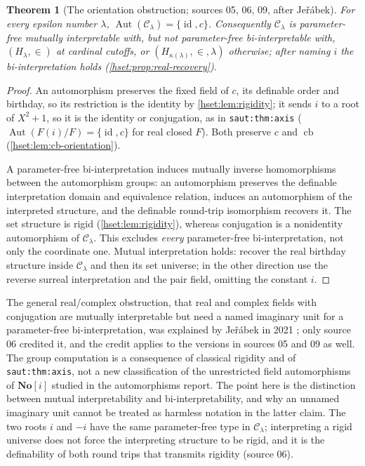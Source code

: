 \documentclass[11pt,letterpaper]{article}
\newtheorem{theorem}{Theorem}[section]
\theoremstyle{definition}
\theoremstyle{remark}
\newcommand{\No}{\mathbf{No}}
\newcommand{\C}{\mathcal C}
\newcommand{\id}{\operatorname{id}}
\newcommand{\Aut}{\operatorname{Aut}}
\newcommand{\cb}{\operatorname{cb}}
\newcommand{\lbl}[1]{\nolinkurl{#1}}
\begin{document}
\begin{theorem}[The orientation obstruction; sources 05, 06, 09, after Je\v{r}\'abek]
\label{hset:thm:orientation}
For every epsilon number $\lambda$, $\Aut(\C_\lambda)=\{\id,c\}$. Consequently
$\C_\lambda$ is parameter-free mutually interpretable with, but not
parameter-free bi-interpretable with, $(H_\lambda,\in)$ at cardinal cutoffs, or
$(H_{\kappa(\lambda)},\in,\lambda)$ otherwise; after naming $i$ the
bi-interpretation holds (\cref{hset:prop:real-recovery}).
\end{theorem}
\begin{proof}
An automorphism preserves the fixed field of $c$, its definable order and
birthday, so its restriction is the identity by \cref{hset:lem:rigidity}; it
sends $i$ to a root of $X^2+1$, so it is the identity or conjugation, as in
\lbl{saut:thm:axis} ($\Aut(F(i)/F)=\{\id,c\}$ for real closed $F$). Both
preserve $c$ and $\cb$ (\cref{hset:lem:cb-orientation}).

A parameter-free bi-interpretation induces mutually inverse homomorphisms
between the automorphism groups: an automorphism preserves the definable
interpretation domain and equivalence relation, induces an automorphism of the
interpreted structure, and the definable round-trip isomorphism recovers it. The
set structure is rigid (\cref{hset:lem:rigidity}), whereas conjugation is a
nonidentity automorphism of $\C_\lambda$. This excludes \emph{every}
parameter-free bi-interpretation, not only the coordinate one. Mutual
interpretation holds: recover the real birthday structure inside $\C_\lambda$ and
then its set universe; in the other direction use the reverse surreal
interpretation and the pair field, omitting the constant $i$.
\end{proof}

The general real/complex obstruction, that real and complex fields with
conjugation are mutually interpretable but need a named imaginary unit for a
parameter-free bi-interpretation, was explained by Je\v{r}\'abek in 2021
\cite{Jerabek}; only source 06 credited it, and the credit applies to the
versions in sources 05 and 09 as well. The group computation is a consequence of
classical rigidity and of \lbl{saut:thm:axis}, not a new classification of the
unrestricted field automorphisms of $\No[i]$ studied in the automorphisms report.
The point here is the distinction between mutual interpretability and
bi-interpretability, and why an unnamed imaginary unit cannot be treated as
harmless notation in the latter claim. The two roots $i$ and $-i$ have the same
parameter-free type in $\C_\lambda$; interpreting a rigid universe does not force
the interpreting structure to be rigid, and it is the definability of both round
trips that transmits rigidity (source 06).
\end{document}
